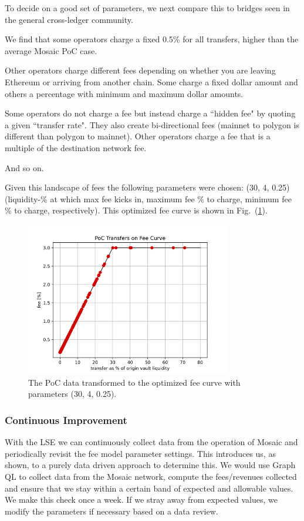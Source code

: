 %
To decide on a good set of parameters, we next compare this to bridges seen in the general cross-ledger community.

We find that some operators charge a fixed 0.5\% for all transfers, higher than the average Mosaic PoC case.

Other operators charge different fees depending on whether you are leaving Ethereum or arriving from another chain. Some charge a fixed dollar amount and others a percentage with minimum and maximum dollar amounts.

Some operators do not charge a fee but instead charge a ``hidden fee" by quoting a given ``transfer rate". They also create bi-directional fees (mainnet to polygon is different than polygon to mainnet).
%
Other operators charge a fee that is a multiple of the destination network fee.

And so on.

Given this landscape of fees the following parameters were chosen: (30, 4, 0.25) (liquidity-\% at which max fee kicks in, maximum fee \% to charge, minimum fee \% to charge, respectively).
%
This optimized fee curve is shown in Fig.~(\ref{fig:pocdatafeesopt}).
%
\begin{figure}
    \centering
    \includegraphics[width=0.8\textwidth]{images/mosaic/poc_optimized.png}
    \caption{The PoC data transformed to the optimized fee curve with parameters (30, 4, 0.25).}
    \label{fig:pocdatafeesopt}
\end{figure}
%

\subsubsection{Continuous Improvement}

With the LSE we can continuously collect data from the operation of Mosaic and periodically revisit the fee model parameter settings.
%
This introduces us, as shown, to a purely data driven approach to determine this. We would use Graph QL \cite{GraphQLAPI} to collect data from the Mosaic network, compute the fees/revenues collected and ensure that we stay within a certain band of expected and allowable values. We make this check once a week.
%
If we stray away from expected values, we modify the parameters if necessary based on a data review.
